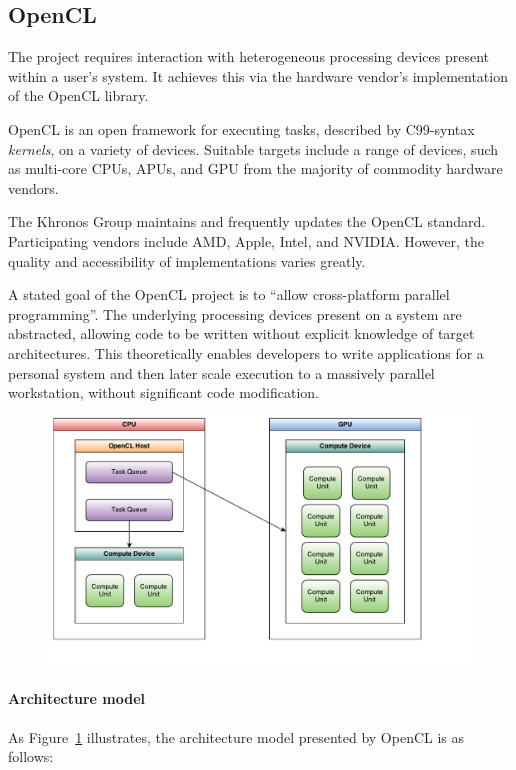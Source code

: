 \subsection{OpenCL}
The project requires interaction with heterogeneous processing devices present within a user's system.
It achieves this via the hardware vendor's implementation of the \ac{OpenCL} library.

\ac{OpenCL} is an open framework for executing tasks, described by C99-syntax \emph{kernels}, on a variety of devices.
Suitable targets include a range of devices, such as multi-core \acp{CPU}, \acp{APU}, and \ac{GPU} from the majority of commodity hardware vendors.

The Khronos Group maintains and frequently updates the \ac{OpenCL} standard\cite{khronos}.
Participating vendors include \ac{AMD}, Apple, Intel, and NVIDIA.
However, the quality and accessibility of implementations varies greatly.

A stated goal of the \ac{OpenCL} project is to ``allow cross-platform parallel programming''.
The underlying processing devices present on a system are abstracted, allowing code to be written without explicit knowledge of target architectures.
This theoretically enables developers to write applications for a personal system and then later scale execution to a massively parallel workstation, without significant code modification.

\begin{figure}[h]
\begin{center}
	\includegraphics[width=4.8in]{./figures/OpenCLModel}
	\label{fig:ocl_model}
\end{center}
\end{figure}

\paragraph*{Architecture model}
As Figure~\ref{fig:ocl_model} illustrates, the architecture model presented by \ac{OpenCL} is as follows:

